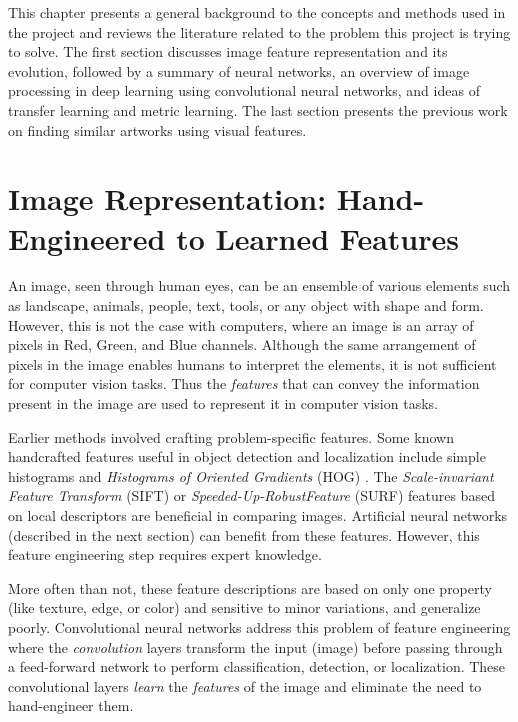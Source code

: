This chapter presents a general background to the concepts and methods used in the project and reviews the literature related to the problem this project is trying to solve. The first section discusses image feature representation and its evolution, followed by a summary of neural networks, an overview of image processing in deep learning using convolutional neural networks, and ideas of transfer learning and metric learning. The last section presents the previous work on finding similar artworks using visual features.

\section{Image Representation: Hand-Engineered to Learned Features}

An image, seen through human eyes, can be an ensemble of various elements such as landscape, animals, people, text, tools, or any object with shape and form. However, this is not the case with computers, where an image is an array of pixels in Red, Green, and Blue channels. Although the same arrangement of pixels in the image enables humans to interpret the elements, it is not sufficient for computer vision tasks. Thus the \textit{features} that can convey the information present in the image are used to represent it in computer vision tasks. 

Earlier methods involved crafting problem-specific features. Some known handcrafted features useful in object detection and localization include simple histograms and \emph{Histograms of Oriented Gradients} (HOG) \cite{Dalal2005HistogramsOO}. The \emph{Scale-invariant Feature Transform} (SIFT) \cite{lowe2004distinctive} or \emph{Speeded-Up-RobustFeature} (SURF) \cite{BAY2008346} features based on local descriptors are beneficial in comparing images. Artificial neural networks (described in the next section) can benefit from these features. However, this feature engineering step requires expert knowledge.

More often than not, these feature descriptions are based on only one property (like texture, edge, or color) and sensitive to minor variations, and generalize poorly. Convolutional neural networks address this problem of feature engineering where the \textit{convolution} layers transform the input (image) before passing through a feed-forward network to perform classification, detection, or localization. These convolutional layers \textit{learn} the \textit{features} of the image and eliminate the need to hand-engineer them.

